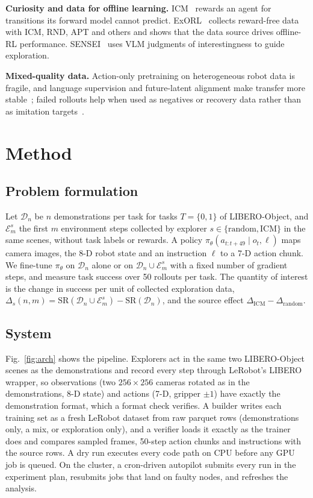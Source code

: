 \documentclass[conference]{IEEEtran}
\begin{document}
\textbf{Curiosity and data for offline learning.} ICM~\cite{icm} rewards an agent for transitions its forward model cannot predict. ExORL~\cite{exorl} collects reward-free data with ICM, RND, APT and others and shows that the data source drives offline-RL performance. SENSEI~\cite{sensei} uses VLM judgments of interestingness to guide exploration.

\textbf{Mixed-quality data.} Action-only pretraining on heterogeneous robot data is fragile, and language supervision and future-latent alignment make transfer more stable~\cite{negtransfer}; failed rollouts help when used as negatives or recovery data rather than as imitation targets~\cite{fact}.

\section{Method}
\subsection{Problem formulation}
Let $\mathcal{D}_n$ be $n$ demonstrations per task for tasks $T=\{0,1\}$ of LIBERO-Object, and $\mathcal{E}_m^{s}$ the first $m$ environment steps collected by explorer $s\in\{\text{random},\text{ICM}\}$ in the same scenes, without task labels or rewards. A policy $\pi_\theta(a_{t:t+49}\mid o_t, \ell)$ maps camera images, the 8-D robot state and an instruction $\ell$ to a 7-D action chunk. We fine-tune $\pi_\theta$ on $\mathcal{D}_n$ alone or on $\mathcal{D}_n\cup\mathcal{E}_m^{s}$ with a fixed number of gradient steps, and measure task success over 50 rollouts per task. The quantity of interest is the change in success per unit of collected exploration data, $\Delta_s(n,m)=\mathrm{SR}(\mathcal{D}_n\cup\mathcal{E}^s_m)-\mathrm{SR}(\mathcal{D}_n)$, and the source effect $\Delta_{\text{ICM}}-\Delta_{\text{random}}$.

\subsection{System}
Fig.~\ref{fig:arch} shows the pipeline. Explorers act in the same two LIBERO-Object scenes as the demonstrations and record every step through LeRobot's LIBERO wrapper, so observations (two $256\times256$ cameras rotated as in the demonstrations, 8-D state) and actions (7-D, gripper $\pm1$) have exactly the demonstration format, which a format check verifies. A builder writes each training set as a fresh LeRobot dataset from raw parquet rows (demonstrations only, a mix, or exploration only), and a verifier loads it exactly as the trainer does and compares sampled frames, 50-step action chunks and instructions with the source rows. A dry run executes every code path on CPU before any GPU job is queued. On the cluster, a cron-driven autopilot submits every run in the experiment plan, resubmits jobs that land on faulty nodes, and refreshes the analysis.
\end{document}
